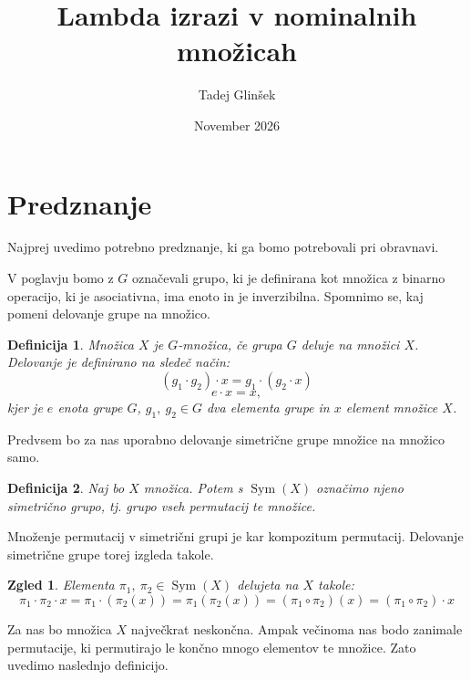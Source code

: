 \documentclass{article}
\title{Lambda izrazi v nominalnih množicah}
\author{Tadej Glinšek}
\date{November 2026}
\DeclareMathOperator{\Sym}{Sym}
\newtheorem{definicija}{Definicija}
\newtheorem{zgled}{Zgled}
\begin{document}
\maketitle




\section{Predznanje}
Najprej uvedimo potrebno predznanje, ki ga bomo potrebovali pri obravnavi. 

V poglavju bomo z \(G\) označevali grupo, ki je definirana kot množica z binarno operacijo, ki je asociativna, ima enoto in je inverzibilna. Spomnimo se, kaj pomeni delovanje grupe na množico.
\begin{definicija}
    
Množica \(X\) je \emph{\(G\)-množica}, če grupa \(G\) deluje na množici \(X\). Delovanje je definirano na sledeč način:
\[
    (g_1 \cdot g_2) \cdot x = g_1 \cdot (g_2 \cdot x)
\]
\[
    e \cdot x = x,
\]
kjer je \(e\) enota grupe \(G\), \(g_1,\ g_2 \in G\) dva elementa grupe in \(x\) element množice \(X\).
\end{definicija}

Predvsem bo za nas uporabno delovanje simetrične grupe množice na množico samo.

\begin{definicija}
    Naj bo \(X\) množica. Potem s \(\Sym(X)\) označimo njeno simetrično grupo, tj. grupo vseh permutacij te množice.
\end{definicija}

Množenje permutacij v simetrični grupi je kar kompozitum permutacij. Delovanje simetrične grupe torej izgleda takole.

\begin{zgled}
Elementa \(\pi_1,\ \pi_2 \in \Sym(X)\) delujeta na \(X\) takole:
\[\pi_1 \cdot \pi_2 \cdot x = \pi_1 \cdot (\pi_2(x)) = \pi_1(\pi_2(x)) = (\pi_1 \circ \pi_2)(x) = (\pi_1 \circ \pi_2) \cdot x\]
\end{zgled}

Za nas bo množica \(X\) največkrat neskončna. Ampak večinoma nas bodo zanimale permutacije, ki permutirajo le končno mnogo elementov te množice. Zato uvedimo naslednjo definicijo.
\end{document}
